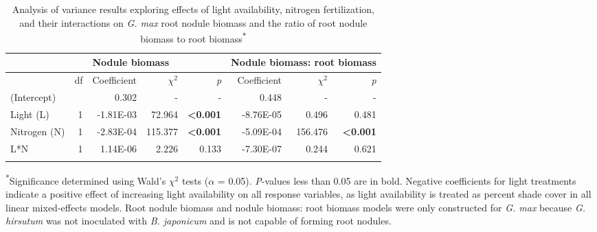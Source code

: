\newpage
\begin{landscape}
\begin{table}
    \caption{Analysis of variance results exploring effects of light availability, nitrogen fertilization, and their interactions on \textit{G. max} root nodule biomass and the ratio of root nodule biomass to root biomass\textsuperscript{$*$}}
    \centering
    \begin{tabular}{p{2.5cm}p{0.5cm}p{2cm}p{1.5cm}p{1.5cm}p{2cm}p{1.5cm}p{1.5cm}}
        && 
        \multicolumn{3}{l}{Nodule biomass} & \multicolumn{3}{l}{Nodule biomass: root biomass} 
        \\
        \hline
        & \multicolumn{1}{r}{df}
        & \multicolumn{1}{r}{Coefficient}   & \multicolumn{1}{r}{$\chi^{2}$}        & \multicolumn{1}{r}{\textit{p}}
        & \multicolumn{1}{r}{Coefficient}   & \multicolumn{1}{r}{$\chi^{2}$}        & \multicolumn{1}{r}{\textit{p}}
        \\
        \hline
        
        (Intercept)
        && \multicolumn{1}{r}{0.302}        & \multicolumn{1}{r}{-}                 & \multicolumn{1}{r}{-}
        & \multicolumn{1}{r}{0.448}         & \multicolumn{1}{r}{-}                 & \multicolumn{1}{r}{-} 
        \\
    
        Light (L) & \multicolumn{1}{r}{1}
        & \multicolumn{1}{r}{-1.81E-03}     & \multicolumn{1}{r}{72.964}            & \multicolumn{1}{r}{\textbf{<0.001}}
        & \multicolumn{1}{r}{-8.76E-05}     & \multicolumn{1}{r}{0.496}             & \multicolumn{1}{r}{0.481} 
        \\
    
        Nitrogen (N) & \multicolumn{1}{r}{1}
        & \multicolumn{1}{r}{-2.83E-04}     & \multicolumn{1}{r}{115.377}           & \multicolumn{1}{r}{\textbf{<0.001}}
        & \multicolumn{1}{r}{-5.09E-04}     & \multicolumn{1}{r}{156.476}           & \multicolumn{1}{r}{\textbf{<0.001}} 
        \\
    
        L*N & \multicolumn{1}{r}{1}
        &  \multicolumn{1}{r}{1.14E-06}     &   \multicolumn{1}{r}{2.226}           & \multicolumn{1}{r}{0.133}
        & \multicolumn{1}{r}{-7.30E-07}     &   \multicolumn{1}{r}{0.244}           & \multicolumn{1}{r}{0.621}
        \\
        \hline
        \\
    \end{tabular}%
    \label{tab:table2.2}
\end{table}
\noindent \textsuperscript{*}Significance determined using Wald’s $\chi^{2}$ tests ($\alpha$ = 0.05). \textit{P}-values less than 0.05 are in bold. Negative coefficients for light treatments indicate a positive effect of increasing light availability on all response variables, as light availability is treated as percent shade cover in all linear mixed-effects models. Root nodule biomass and nodule biomass: root biomass models were only constructed for \textit{G. max} because \textit{G. hirsutum} was not inoculated with \textit{B. japonicum} and is not capable of forming root nodules.
\end{landscape}
\clearpage

